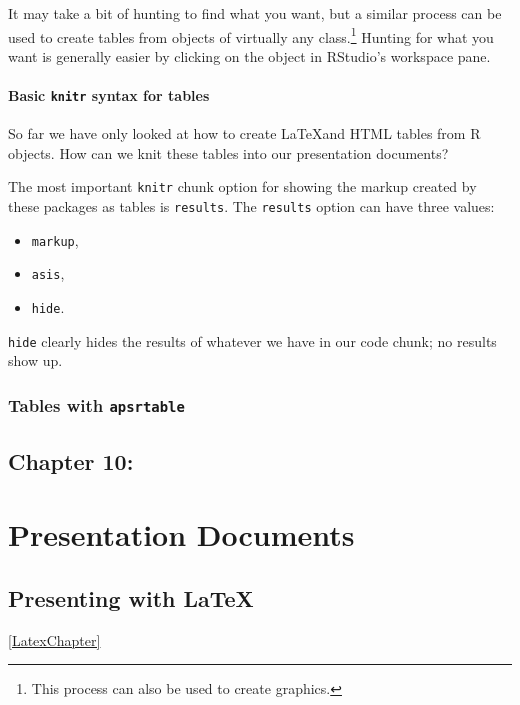 \documentclass[ChapterTOCs,krantz1]{krantz}\usepackage{graphicx, color}
\begin{document}
It may take a bit of hunting to find what you want, but a similar process can be used to create tables from objects of virtually any class.\footnote{This process can also be used to create graphics.} Hunting for what you want is generally easier by clicking on the object in RStudio's workspace pane.

\subsection{Basic \texttt{knitr} syntax for tables}

So far we have only looked at how to create \LaTeX and HTML tables from R objects. How can we knit these tables into our presentation documents?

The most important \texttt{knitr} chunk option for showing the markup created by these packages as tables is \texttt{results}. The \texttt{results} option can have three values:

\begin{itemize}
\item
  \texttt{markup},
\item
  \texttt{asis},
\item
  \texttt{hide}.
\end{itemize}
\texttt{hide} clearly hides the results of whatever we have in our code chunk; no results show up.

\section{Tables with \texttt{apsrtable}}






\chapter{Chapter 10:}


\part{Presentation Documents}





\chapter{Presenting with \LaTeX}\ref{LatexChapter}
\end{document}
